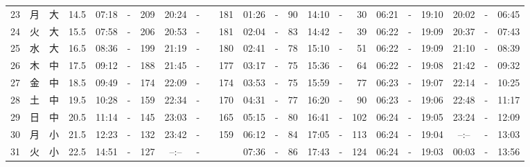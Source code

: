 \documentclass[12pt,a4j]{jsarticle}
\begin{document}
\begin{table}[htbp]
\begin{center}
{\begin{tabular}{|rc|cr|ccrccr|ccrccr|ccc|ccc|}
23 & 月 & 大 & 14.5 &  07:18 &-& 209 &  20:24 &-& 181 &  01:26 &-&  90 &  14:10 &-&  30 & 06:21 & -& 19:10 & 20:02 & -& 06:45 \\
24 & 火 & 大 & 15.5 &  07:58 &-& 206 &  20:53 &-& 181 &  02:04 &-&  83 &  14:42 &-&  39 & 06:22 & -& 19:09 & 20:37 & -& 07:43 \\
25 & 水 & 大 & 16.5 &  08:36 &-& 199 &  21:19 &-& 180 &  02:41 &-&  78 &  15:10 &-&  51 & 06:22 & -& 19:09 & 21:10 & -& 08:39 \\
26 & 木 & 中 & 17.5 &  09:12 &-& 188 &  21:45 &-& 177 &  03:17 &-&  75 &  15:36 &-&  64 & 06:22 & -& 19:08 & 21:42 & -& 09:32 \\
27 & 金 & 中 & 18.5 &  09:49 &-& 174 &  22:09 &-& 174 &  03:53 &-&  75 &  15:59 &-&  77 & 06:23 & -& 19:07 & 22:14 & -& 10:25 \\
28 & 土 & 中 & 19.5 &  10:28 &-& 159 &  22:34 &-& 170 &  04:31 &-&  77 &  16:20 &-&  90 & 06:23 & -& 19:06 & 22:48 & -& 11:17 \\
29 & 日 & 中 & 20.5 &  11:14 &-& 145 &  23:03 &-& 165 &  05:15 &-&  80 &  16:41 &-& 102 & 06:24 & -& 19:05 & 23:24 & -& 12:09 \\
30 & 月 & 小 & 21.5 &  12:23 &-& 132 &  23:42 &-& 159 &  06:12 &-&  84 &  17:05 &-& 113 & 06:24 & -& 19:04 & --:-- & -& 13:03 \\
31 & 火 & 小 & 22.5 &  14:51 &-& 127 &  --:-- &-&~~~~~ &  07:36 &-&  86 &  17:43 &-& 124 & 06:24 & -& 19:03 & 00:03 & -& 13:56 \\
   \hline
   \end{tabular}}
   \end{center}
\end{table}
\newpage
\end{document}
